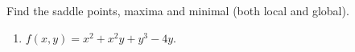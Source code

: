 Find the saddle points, maxima and minimal (both local and global).

\begin{enumerate}
\item \label{problemextremax^2+x^2y+y^3-2y} $f(x,y)=x^2+ x^2y+y^3-4y$.

\end{enumerate}